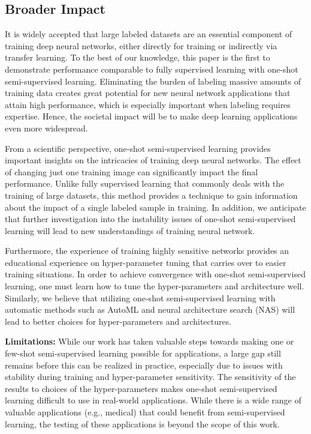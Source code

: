\documentclass[final]{cvpr}
\newcommand{\OSSSL}{one-shot semi-supervised learning }
\newcommand{\OSSSLno}{one-shot semi-supervised learning}
\newcommand{\SSL}{semi-supervised learning }
\newcommand{\SSLno}{semi-supervised learning}
\begin{document}
\subsection{Broader Impact}

It is widely accepted that large labeled datasets are an essential component of training deep neural networks, either directly for training or indirectly via transfer learning.
To the best of our knowledge, this paper is the first to demonstrate performance comparable to fully supervised learning with \OSSSLno.
Eliminating the burden of labeling massive amounts of training data creates great potential for new neural network applications that attain high performance, which is especially important when labeling requires expertise.  
Hence, the societal impact will be to make deep learning applications even more widespread.



From a scientific perspective, \OSSSL provides important insights on the intricacies of training deep neural networks.
The effect of changing just one training image can significantly impact the final performance.
Unlike fully supervised learning that commonly deals with the training of large datasets, this method provides a technique to gain information about the impact of a single labeled sample in training.
In addition, we anticipate that further investigation into the instability issues of \OSSSL will lead to new understandings of training neural network.

Furthermore, the experience of training highly sensitive networks provides an educational experience on hyper-parameter tuning that carries over to easier training situations.
In order to achieve convergence with \OSSSLno, one must learn how to tune the hyper-parameters and architecture well.
Similarly, we believe that utilizing \OSSSL with automatic methods such as AutoML and neural architecture search (NAS) will lead to better choices for hyper-parameters and architectures. 


\textbf{Limitations:}
While our work has taken valuable steps towards making one or few-shot \SSL possible for applications, a large gap still remains before this can be realized in practice, especially due to issues with stability during training and hyper-parameter sensitivity.
The sensitivity of the results to choices of the hyper-parameters makes \OSSSL difficult to use in real-world applications.
While there is a wide range of valuable applications (e.g., medical) that could benefit from \SSLno, the testing of these applications is beyond the scope of this work.
\end{document}
